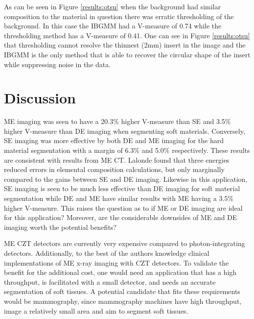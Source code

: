\documentclass[a4paper,11pt]{article}
\begin{document}
As can be seen in Figure \ref{results:otsu} when the background had similar composition to the material in question there was erratic thresholding of the background. In this case the IBGMM had a V-measure of 0.74 while the thresholding method has a V-measure of 0.41. One can see in Figure \ref{results:otsu} that thresholding cannot resolve the thinnest (2mm) insert in the image and the IBGMM is the only method that is able to recover the circular shape of the insert while suppressing noise in the data.



\section{Discussion}

ME imaging was seen to have a 20.3\% higher V-measure than SE and 3.5\% higher V-measure than DE imaging when segmenting soft materials. Conversely, SE imaging was more effective by both DE and ME imaging for the hard material segmentation with a margin of 6.3\% and 5.0\% respectively. These results are consistent with results from ME CT. Lalonde \cite{Lalonde2016ACT} found that three energies reduced errors in elemental composition calculations, but only marginally compared to the gains between SE and DE imaging. Likewise in this application, SE imaging is seen to be much less effective than DE imaging for soft material segmentation while DE and ME have similar results with ME having a 3.5\% higher V-measure. This raises the question as to if ME or DE imaging are ideal for this application? Moreover, are the considerable downsides of ME and DE imaging worth the potential benefits?

ME CZT detectors are currently very expensive compared to photon-integrating detectors. Additionally, to the best of the authors knowledge clinical implementations of ME x-ray imaging with CZT detectors. To validate the benefit for the additional cost, one would need an application that has a high throughput, is facilitated with a small detector, and needs an accurate segmentation of soft tissues. A potential candidate that fits these requirements would be mammography, since mammography machines have high throughput, image a relatively small area and aim to segment soft tissues. 
\end{document}
